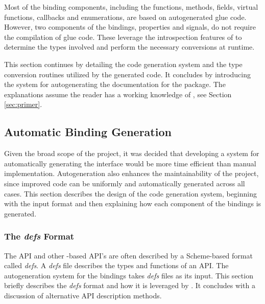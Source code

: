 \documentclass[article]{jss}
\begin{document}
Most of the binding components, including the functions, methods, fields, 
virtual functions, callbacks and enumerations, are based on autogenerated glue code. 
However, two components of the bindings, properties and signals, do not 
require the compilation of glue code. These leverage the introspection
features of  to determine the types involved and perform the
necessary conversions at runtime.

This section continues by detailing the code generation system and the
type conversion routines utilized by the generated code. It concludes by 
introducing the system for autogenerating the  documentation for
the package. The explanations assume the reader has a working knowledge of 
, see Section \ref{sec:primer}.

\subsection{Automatic Binding Generation}

Given the broad scope of the project, it was decided that developing a system
for automatically generating the interface would be more time efficient than
manual implementation. Autogeneration also enhances the maintainability of the 
project, since improved code can be uniformly and automatically generated across
all cases. This section describes the design of the code generation system,
beginning with the input format and then explaining how each component of
the bindings is generated.

\subsubsection[The defs Format]{The \emph{defs} Format}

The  API and other -based API's are often described by
a Scheme-based format called \emph{defs}. A \emph{defs} file describes the types
and functions of an API. The autogeneration system for the  bindings
takes \emph{defs} files as its input. This section briefly describes the 
\emph{defs} format and how it is leveraged by . It concludes
with a discussion of alternative API description methods.
\end{document}
